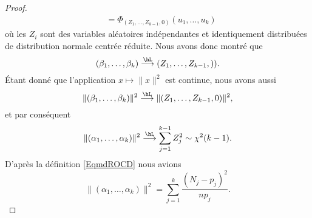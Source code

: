 \begin{proof}
\begin{subequations}
\begin{align}
			                                                                     & =\Phi_{(Z_1,\ldots, Z_{k-1},0)}(u_1,\ldots, u_k)
		\end{align}
	\end{subequations}
	où les \( Z_i\) sont des variables aléatoires indépendantes et identiquement distribuées de distribution normale centrée réduite. Nous avons donc montré que
	\begin{equation}
		(\beta_1,\ldots, \beta_k)\stackrel{\hL}{\longrightarrow}(Z_1,\ldots, Z_{k-1},)).
	\end{equation}
	Étant donné que l'application \( x\mapsto \| x \|^2\) est continue, nous avons aussi
	\begin{equation}
		\| (\beta_1,\ldots, \beta_k) \|^2\stackrel{\hL}{\longrightarrow}\| (Z_1,\ldots, Z_{k-1},0) \|^2,
	\end{equation}
	et par conséquent
	\begin{equation}
		\| (\alpha_1,\ldots, \alpha_k) \|^2\stackrel{\hL}{\longrightarrow}\sum_{j=1}^{k-1}Z_j^2\sim\chi^2(k-1).
	\end{equation}
	D'après la définition \eqref{EqmdROCD} nous avions
	\begin{equation}
		\| (\alpha_1,\ldots, \alpha_k) \|^2=\sum_{j=1}^k\frac{ (N_j-p_j)^2 }{ np_j }.
	\end{equation}
\end{proof}
